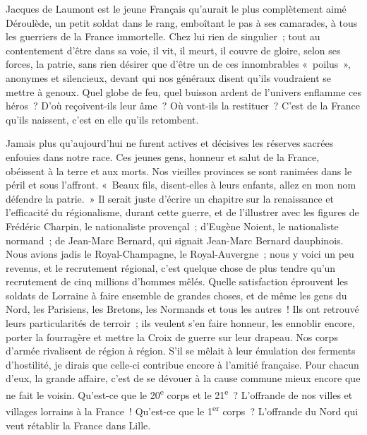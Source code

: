 \documentclass[french,twoside]{book} %
\begin{document}
Jacques de Laumont est le jeune Français qu’aurait le plus complètement aimé Déroulède, un petit soldat dans le rang, emboîtant le pas à ses camarades, à tous les guerriers de la France immortelle. Chez lui rien de singulier ; tout au contentement d’être dans sa voie, il vit, il meurt, il couvre de gloire, selon ses forces, la patrie, sans rien désirer que d’être un de ces innombrables « poilus », anonymes et silencieux, devant qui nos généraux disent qu’ils voudraient se mettre à genoux. Quel globe de feu, quel buisson ardent de l’univers enflamme ces héros ? D’où reçoivent-ils leur âme ? Où vont-ils la restituer ? C’est de la France qu’ils naissent, c’est en elle qu’ils retombent.‌\par
Jamais plus qu’aujourd’hui ne furent actives et décisives les réserves sacrées enfouies dans notre race. Ces jeunes gens, honneur et salut de la France, obéissent à la terre et aux morts. Nos vieilles provinces se sont ranimées dans le péril et sous l’affront. « Beaux fils, disent-elles à leurs enfants, allez en mon nom défendre la patrie. » Il serait juste d’écrire un chapitre sur la renaissance et l’efficacité du régionalisme, durant cette guerre, et de l’illustrer avec les figures de Frédéric Charpin, le nationaliste provençal ; d’Eugène Noient, le nationaliste normand ; de Jean-Marc Bernard, qui signait Jean-Marc Bernard dauphinois. Nous avions jadis le Royal-Champagne, le Royal-Auvergne ; nous y voici un peu revenus, et le recrutement régional, c’est quelque chose de plus tendre qu’un recrutement de cinq millions d’hommes mêlés. Quelle satisfaction éprouvent les soldats de Lorraine à faire ensemble de grandes choses, et de même les gens du Nord, les Parisiens, les Bretons, les Normands et tous les autres ! Ils ont retrouvé leurs particularités de terroir ; ils veulent s’en faire honneur, les ennoblir encore, porter la fourragère et mettre la Croix de guerre sur leur drapeau. Nos corps d’armée rivalisent de région à région. S’il se mêlait à leur émulation des ferments d’hostilité, je dirais que celle-ci contribue encore à l’amitié française. Pour chacun d’eux, la grande affaire, c’est de se dévouer à la cause commune mieux encore que ne fait le voisin. Qu’est-ce que le 20\textsuperscript{e} corps et le 21\textsuperscript{e} ? L’offrande de nos villes et villages lorrains à la France ! Qu’est-ce que le 1\textsuperscript{er} corps ? L’offrande du Nord qui veut rétablir la France dans Lille.‌\par
\end{document}
